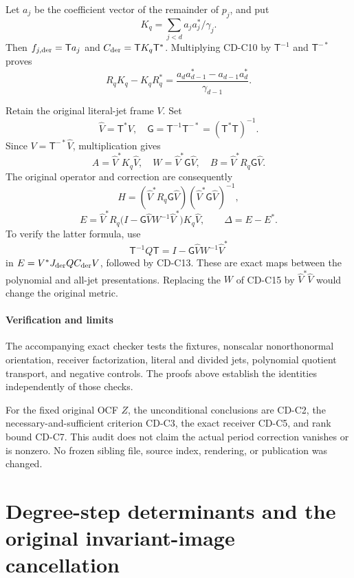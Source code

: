Let \(a_j\) be the coefficient vector of the remainder of \(p_j\), and put \[
K_q=\sum_{j<d}a_ja_j^*/\gamma_j.
\] Then \(f_{j,\rm der}=\mathsf T a_j\) and \(C_{\rm der}=\mathsf T K_q\mathsf T^*\). Multiplying CD-C10 by \(\mathsf T^{-1}\) and \(\mathsf T^{-*}\) proves \[
R_qK_q-K_qR_q^*
=\frac{a_da_{d-1}^*-a_{d-1}a_d^*}{\gamma_{d-1}}.
\tag{CD-C14}
\]

Retain the original literal-jet frame \(V\). Set \[
\widehat V=\mathsf T^*V,\quad
\mathsf G=\mathsf T^{-1}\mathsf T^{-*}=(\mathsf T^*\mathsf T)^{-1}.
\] Since \(V=\mathsf T^{-*}\widehat V\), multiplication gives \[
A=\widehat V^*K_q\widehat V,\quad
W=\widehat V^*\mathsf G\widehat V,\quad
B=\widehat V^*R_q\mathsf G\widehat V.
\tag{CD-C15}
\] The original operator and correction are consequently \[
H=(\widehat V^*R_q\mathsf G\widehat V)
(\widehat V^*\mathsf G\widehat V)^{-1},
\] \[
E=\widehat V^*R_q
\bigl(I-\mathsf G\widehat VW^{-1}\widehat V^*\bigr)
K_q\widehat V,\qquad \Delta=E-E^*.
\tag{CD-C16}
\] To verify the latter formula, use \[
\mathsf T^{-1}Q\mathsf T
=I-\mathsf G\widehat VW^{-1}\widehat V^*
\] in \(E=V^*J_{\rm der}QC_{\rm der}V\), followed by CD-C13. These are exact maps between the polynomial and all-jet presentations. Replacing the \(W\) of CD-C15 by \(\widehat V^*\widehat V\) would change the original metric.

\subsection{Verification and limits}\label{cdaudit:verification-and-limits}

The accompanying exact checker tests the fixtures, nonscalar nonorthonormal orientation, receiver factorization, literal and divided jets, polynomial quotient transport, and negative controls. The proofs above establish the identities independently of those checks.

For the fixed original OCF \(Z\), the unconditional conclusions are CD-C2, the necessary-and-sufficient criterion CD-C3, the exact receiver CD-C5, and rank bound CD-C7. This audit does not claim the actual period correction vanishes or is nonzero. No frozen sibling file, source index, rendering, or publication was changed.

\endgroup

\clearpage\begingroup
\part*{Degree-step determinants and the original invariant-image cancellation}
\newcommand{\dsrootC}{\mathbb C}
\newcommand{\dsrootR}{\mathbb R}
\newcommand{\dsrootcalD}{\mathscr D}


